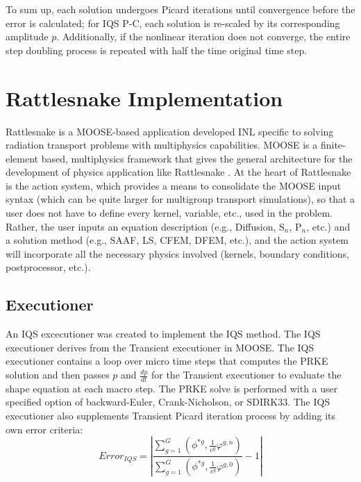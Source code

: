 \documentclass[12pt]{scrartcl}
\newcommand{\rattlesnake}{Rattlesnake }
\newcommand{\be}{\begin{equation}}
\newcommand{\ee}{\end{equation}}
\begin{document}
To sum up, each solution undergoes Picard iterations until convergence before the error is calculated; for IQS P-C, each solution is re-scaled by its corresponding amplitude $p$.  Additionally, if the nonlinear iteration does not converge, the entire step doubling process is repeated with half the time original time step. 

\section{\rattlesnake Implementation}

\rattlesnake is a MOOSE-based application developed INL specific to solving radiation transport problems with multiphysics capabilities.  MOOSE is a finite-element based, multiphysics framework that gives the general architecture for the development of physics application like \rattlesnake.   At the heart of \rattlesnake is the action system, which provides a means to consolidate the MOOSE input syntax (which can be quite larger for multigroup transport simulations), so that a user does not have to define every kernel, variable, etc., used in the problem. Rather, the user inputs an equation description 
(e.g., Diffusion, S$_n$, P$_n$, etc.) and a solution method (e.g., SAAF, LS, CFEM, DFEM, etc.), and the action system will incorporate all the necessary physics involved (kernels, boundary conditions, postprocessor, etc.).

 
\subsection{Executioner}

An IQS excecutioner was created to implement the IQS method. The IQS executioner derives from the Transient executioner in MOOSE.  The IQS executioner contains a loop over micro time steps that computes the PRKE solution and then passes $p$ and $\frac{dp}{dt}$ for the Transient executioner to evaluate the shape equation at each macro step.  The PRKE solve is performed with a user specified option of backward-Euler, Crank-Nicholson, or SDIRK33.   The IQS executioner also supplements Transient Picard iteration process by adding its own error criteria:
\be
Error_{IQS}=\left|\frac{\sum_{g=1}^G\left(\phi^{*g},\frac{1}{v^g}\varphi^{g,n}\right)}{\sum_{g=1}^G\left(\phi^{*g},\frac{1}{v^g}\varphi^{g,0}\right)}-1\right|
\label{eq:eiqs}
\ee
\end{document}
